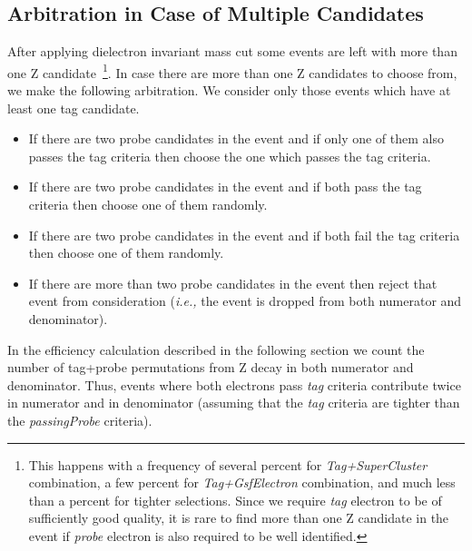 \subsection{Arbitration in Case of Multiple Candidates}
After applying dielectron invariant mass cut some events are left with 
more than one Z candidate~\footnote[1]{This happens with a frequency of 
several percent for \textit{Tag+SuperCluster} combination, a few percent for 
\textit{Tag+GsfElectron} combination, and much less than a percent for 
tighter selections. Since we require \textit{tag} electron to be of sufficiently good quality, 
it is rare to find more than one Z candidate in the event if \textit{probe} 
electron is also required to be well identified.}.
In case there are more than one Z candidates to choose from, we make the following 
arbitration. We consider only those events which have at least one tag 
candidate.
\begin{itemize}
\item
  If there are two probe candidates in the event and if only one of 
  them also passes the tag criteria then choose the one which passes the tag criteria.
\item
  If there are two probe candidates in the event and if both pass the tag criteria 
  then choose one of them randomly.

\item
  If there are two probe candidates in the event and if both fail the tag criteria 
  then choose one of them randomly.

\item
  If there are more than two probe candidates in the event then reject that event from 
  consideration (\textit{i.e.,} the event is dropped from both numerator and denominator).
\end{itemize}
 In the efficiency calculation described in the following section we count the 
number of tag+probe permutations from Z decay in both numerator and denominator.
Thus, events where both electrons pass \textit{tag} criteria contribute twice in 
numerator and in denominator (assuming that the \textit{tag} criteria are tighter 
than the \textit{passingProbe} criteria). 

